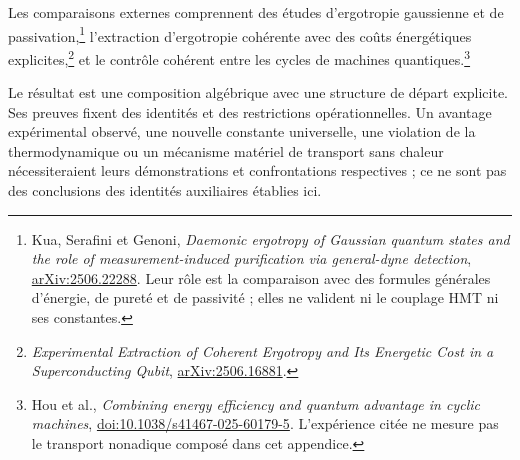 Les comparaisons externes comprennent des études
d’ergotropie gaussienne et de passivation,\footnote{Kua, Serafini
et Genoni, \emph{Daemonic ergotropy of Gaussian quantum
states and the role of measurement-induced purification
via general-dyne detection},
\href{https://arxiv.org/abs/2506.22288}{arXiv:2506.22288}.
Leur rôle est la comparaison avec des formules générales
d’énergie, de pureté et de passivité ; elles ne valident ni le couplage HMT
ni ses constantes.}
l’extraction d’ergotropie cohérente avec des coûts
énergétiques explicites,\footnote{\emph{Experimental
Extraction of Coherent Ergotropy and Its Energetic Cost
in a Superconducting Qubit},
\href{https://arxiv.org/abs/2506.16881}{arXiv:2506.16881}.}
et le contrôle cohérent entre les cycles de machines
quantiques.\footnote{Hou et al., \emph{Combining energy
efficiency and quantum advantage in cyclic machines},
\href{https://doi.org/10.1038/s41467-025-60179-5}{doi:10.1038/s41467-025-60179-5}.
L’expérience citée ne mesure pas le transport nonadique
composé dans cet appendice.}

Le résultat est une composition algébrique avec une
structure de départ explicite. Ses preuves fixent des
identités et des restrictions opérationnelles. Un avantage
expérimental observé, une nouvelle constante universelle,
une violation de la thermodynamique ou un mécanisme matériel
de transport sans chaleur nécessiteraient leurs démonstrations
et confrontations respectives ; ce ne sont pas des conclusions des
identités auxiliaires établies ici.
